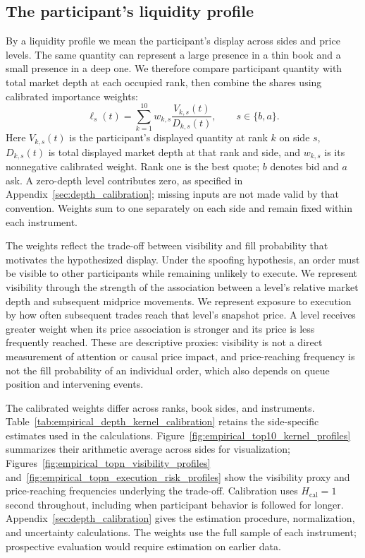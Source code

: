 \subsection{The participant's liquidity profile}
\label{sec:spoofer_timeline}
\label{subsec:topn_depth_profiles}
By a liquidity profile we mean the participant's display across sides and price levels. The same quantity can represent a large presence in a thin book and a small presence in a deep one. We therefore compare participant quantity with total market depth at each occupied rank, then combine the shares using calibrated importance weights:
\begin{equation}
    \ell_s(t)=\sum_{k=1}^{10}w_{k,s}\frac{V_{k,s}(t)}{D_{k,s}(t)},
    \qquad s\in\{b,a\}.
    \label{eq:weighted_topn_liquidity}
\end{equation}
Here $V_{k,s}(t)$ is the participant's displayed quantity at rank $k$ on side $s$, $D_{k,s}(t)$ is total displayed market depth at that rank and side, and $w_{k,s}$ is its nonnegative calibrated weight. Rank one is the best quote; $b$ denotes bid and $a$ ask. A zero-depth level contributes zero, as specified in Appendix~\ref{sec:depth_calibration}; missing inputs are not made valid by that convention. Weights sum to one separately on each side and remain fixed within each instrument.

The weights reflect the trade-off between visibility and fill probability that motivates the hypothesized display. Under the spoofing hypothesis, an order must be visible to other participants while remaining unlikely to execute. We represent visibility through the strength of the association between a level's relative market depth and subsequent midprice movements. We represent exposure to execution by how often subsequent trades reach that level's snapshot price. A level receives greater weight when its price association is stronger and its price is less frequently reached. These are descriptive proxies: visibility is not a direct measurement of attention or causal price impact, and price-reaching frequency is not the fill probability of an individual order, which also depends on queue position and intervening events.

The calibrated weights differ across ranks, book sides, and instruments. Table~\ref{tab:empirical_depth_kernel_calibration} retains the side-specific estimates used in the calculations. Figure~\ref{fig:empirical_top10_kernel_profiles} summarizes their arithmetic average across sides for visualization; Figures~\ref{fig:empirical_topn_visibility_profiles} and~\ref{fig:empirical_topn_execution_risk_profiles} show the visibility proxy and price-reaching frequencies underlying the trade-off. Calibration uses $H_{\mathrm{cal}}=1$ second throughout, including when participant behavior is followed for longer. Appendix~\ref{sec:depth_calibration} gives the estimation procedure, normalization, and uncertainty calculations. The weights use the full sample of each instrument; prospective evaluation would require estimation on earlier data.

